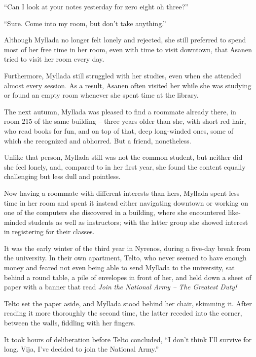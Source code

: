 ``Can I look at your notes yesterday for zero eight oh three?''

``Sure. Come into my room, but don't take anything.''

\centeredstars

Although Myllada no longer felt lonely and rejected, she still preferred to spend most of her free time in her room, even with time to visit downtown, that Asanen tried to visit her room every day.

Furthermore, Myllada still struggled with her studies, even when she attended almost every session. As a result, Asanen often visited her while she was studying or found an empty room whenever she spent time at the library.

\centeredstars

The next autumn, Myllada was pleased to find a roommate already there, in room 215 of the same building -- three years older than she, with short red hair, who read books for fun, and on top of that, deep long-winded ones, some of which she recognized and abhorred. But a friend, nonetheless.

Unlike that person, Myllada still was not the common student, but neither did she feel lonely, and, compared to in her first year, she found the content equally challenging but less dull and pointless.

Now having a roommate with different interests than hers, Myllada spent less time in her room and spent it instead either navigating downtown or working on one of the computers she discovered in a building, where she encountered like-minded students as well as instructors; with the latter group she showed interest in registering for their classes.

\centeredstars

It was the early winter of the third year in Nyrenos, during a five-day break from the university. In their own apartment, Telto, who never seemed to have enough money and feared not even being able to send Myllada to the university, sat behind a round table, a pile of envelopes in front of her, and held down a sheet of paper with a banner that read \emph{Join the National Army -- The Greatest Duty!}

Telto set the paper aside, and Myllada stood behind her chair, skimming it. After reading it more thoroughly the second time, the latter receded into the corner, between the walls, fiddling with her fingers.

It took hours of deliberation before Telto concluded, ``I don't think I'll survive for long. Vija, I've decided to join the National Army.''

